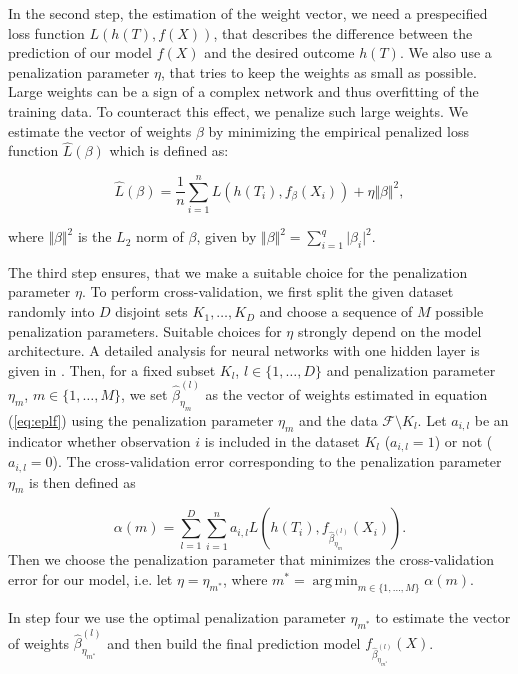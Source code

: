 \documentclass[12pt, a4paper]{article}
\theoremstyle{definition}
\theoremstyle{plain}
\numberwithin{equation}{section}
\numberwithin{figure}{section}
\numberwithin{table}{section}
\DeclareMathOperator*{\argmin}{arg\,min}
\begin{document}
	In the second step, the estimation of the weight vector, we need a prespecified loss function $L(h(T), f(X))$, that describes the difference between the prediction of our model $f(X)$ and the desired outcome $h(T)$.
	We also use a penalization parameter $\eta$, that tries to keep the weights as small as possible.
	Large weights can be a sign of a complex network and thus overfitting of the training data.
	To counteract this effect, we penalize such large weights.
	We estimate the vector of weights $\beta$ by minimizing the empirical penalized loss function $\hat{L}(\beta)$ which is defined as:
	
	\begin{equation}\label{eq:eplf}
	\hat{L}(\beta) = \frac{1}{n} \sum_{i=1}^n L( h(T_i), f_{\beta}(X_i)) + \eta \Vert \beta \Vert ^2,
	\end{equation}
	
	where $\Vert \beta \Vert ^2$ is the $L_2$ norm of $\beta$, given by $\Vert \beta \Vert ^2 = \sum_{i=1}^q \vert \beta _i \vert ^2.$
	
	The third step ensures, that we make a suitable choice for the penalization parameter $\eta$.
	To perform cross-validation, we first split the given dataset randomly into $D$ disjoint sets $K_1,\dots, K_D$ and choose a sequence of $M$ possible penalization parameters.
	Suitable choices for $\eta$ strongly depend on the model architecture.
	A detailed analysis for neural networks with one hidden layer is given in \citet*{regpar}. 
	Then, for a fixed subset $K_l$, $l \in \{1,\dots,D\}$ and penalization parameter $\eta_m$, $m \in \{1,\dots,M\}$, we set $\hat{\beta}_{\eta_{m}}^{(l)}$ as the vector of weights estimated in equation (\ref{eq:eplf}) using the penalization parameter $\eta_m$ and the data $\mathcal{F} \setminus K_l$.
	Let $a_{i,l}$ be an indicator whether observation $i$ is included in the dataset $K_l$ ($a_{i,l} = 1$) or not ($a_{i,l}=0$).
	The cross-validation error corresponding to the penalization parameter $\eta_m$ is then defined as
	
	\begin{equation*}
	 \alpha(m) = \sum_{l=1}^D \sum_{i=1}^n a_{i,l} L(h(T_i), f_{\hat{\beta}_{\eta_m}^{(l)}}(X_i)).
 	\end{equation*}
 	Then we choose the penalization parameter that minimizes the cross-validation error for our model, i.e. let $\eta = \eta_{m^*}$, where $m^* = \argmin_{m \in \{1,\dots,M\}} \alpha(m)$.
 	
 	In step four we use the optimal penalization parameter $\eta_{m^*}$ to estimate the vector of weights $\hat{\beta}_{\eta_{m^*}}^{(l)}$ and then build the final prediction model $f_{\hat{\beta}_{\eta_{m^*}}^{(l)}}(X)$.
 	
\end{document}
